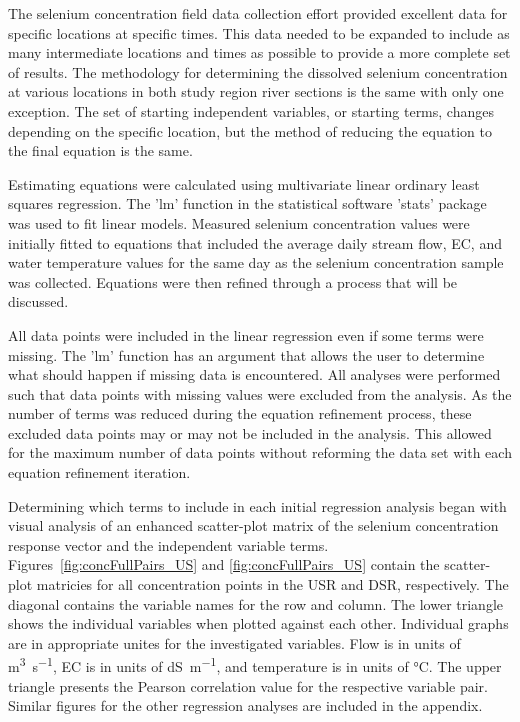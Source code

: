 \begin{linenumbers}




The selenium concentration field data collection effort provided excellent data for specific locations at specific times.  This data needed to be expanded to include as many intermediate locations and times as possible to provide a more complete set of results.  The methodology for determining the dissolved selenium concentration at various locations in both study region river sections is the same with only one exception.  The set of starting independent variables, or starting terms, changes depending on the specific location, but the method of reducing the equation to the final equation is the same.

Estimating equations were calculated using multivariate linear ordinary least squares regression.  The 'lm' function in the statistical software 'stats' package was used to fit linear models.   Measured selenium concentration values were initially fitted to equations that included the average daily stream flow, EC, and water temperature values for the same day as the selenium concentration sample was collected.  Equations were then refined through a process that will be discussed.

All data points were included in the linear regression even if some terms were missing.  The 'lm' function has an argument that allows the user to determine what should happen if missing data is encountered.  All analyses were performed such that data points with missing values were excluded from the analysis.  As the number of terms was reduced during the equation refinement process, these excluded data points may or may not be included in the analysis.  This allowed for the maximum number of data points without reforming the data set with each equation refinement iteration.

Determining which terms to include in each initial regression analysis began with visual analysis of an enhanced scatter-plot matrix of the selenium concentration response vector and the independent variable terms.  Figures~\ref{fig:concFullPairs_US} and \ref{fig:concFullPairs_US} contain the scatter-plot matricies for all concentration points in the USR and DSR, respectively.  The diagonal contains the variable names for the row and column.  The lower triangle shows the individual variables when plotted against each other.  Individual graphs are in appropriate unites for the investigated variables.  Flow is in units of \si{\cubic\meter\per\second}, EC is in units of \si{\deci\siemens\per\meter}, and temperature is in units of \si{\degreeCelsius}.  The upper triangle presents the Pearson correlation value for the respective variable pair.  Similar figures for the other regression analyses are included in the appendix.


\end{linenumbers}
